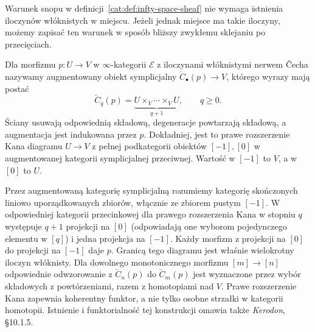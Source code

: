 Warunek snopu w definicji~\ref{cat:def:infty-space-sheaf} nie wymaga istnienia iloczynów włóknistych w miejscu. Jeżeli jednak miejsce ma takie iloczyny, możemy zapisać ten warunek w sposób bliższy zwykłemu sklejaniu po przecięciach.

\begin{definicja}\label{cat:def:infty-cech-nerve}
Dla morfizmu $p:U\to V$ w $\infty$-kategorii $\mathcal E$ z iloczynami włóknistymi nerwem Čecha nazywamy augmentowany obiekt symplicjalny $\check C_\bullet(p)\to V$, którego wyrazy mają postać
\[
 \check C_q(p)=\underbrace{U\times_V\cdots\times_V U}_{q+1},
 \qquad q\geq0.
\]
Ściany usuwają odpowiednią składową, degeneracje powtarzają składową, a augmentacja jest indukowana przez $p$. Dokładniej, jest to prawe rozszerzenie Kana diagramu $U\to V$ z pełnej podkategorii obiektów $[-1],[0]$ w augmentowanej kategorii symplicjalnej przeciwnej. Wartość w $[-1]$ to $V$, a w $[0]$ to $U$.
\end{definicja}

Przez augmentowaną kategorię symplicjalną rozumiemy kategorię skończonych liniowo uporządkowanych zbiorów, włącznie ze zbiorem pustym $[-1]$. W odpowiedniej kategorii przecinkowej dla prawego rozszerzenia Kana w stopniu $q$ występuje $q+1$ projekcji na $[0]$ (odpowiadają one wyborom pojedynczego elementu w $[q]$) i jedna projekcja na $[-1]$. Każdy morfizm z projekcji na $[0]$ do projekcji na $[-1]$ daje $p$. Granicą tego diagramu jest właśnie wielokrotny iloczyn włóknisty. Dla dowolnego monotonicznego morfizmu $[m]\to[n]$ odpowiednie odwzorowanie z $\check C_n(p)$ do $\check C_m(p)$ jest wyznaczone przez wybór składowych z powtórzeniami, razem z homotopiami nad $V$. Prawe rozszerzenie Kana zapewnia koherentny funktor, a nie tylko osobne strzałki w kategorii homotopii. Istnienie i funktorialność tej konstrukcji omawia także \emph{Kerodon}, \S10.1.5.

